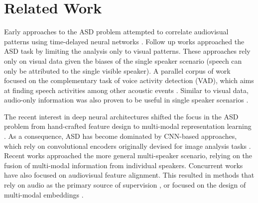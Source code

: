 \documentclass[10pt,twocolumn,letterpaper]{article}
\begin{document}
 \section{Related Work}

Early approaches to the ASD problem \cite{cutler2000look} attempted to correlate audiovisual patterns using time-delayed neural networks \cite{waibel1989phoneme}. Follow up works \cite{saenko2005visualspeech,everingham2009taking} approached the ASD task by limiting the analysis only to visual patterns. These approaches rely only on visual data given the biases of the single speaker scenario (\ie speech can only be attributed to the single visible speaker). A parallel corpus of work focused on the complementary task of voice activity detection (VAD), which aims at finding speech activities among other acoustic events \cite{tanyer2000voice,chang2006voice}. Similar to visual data, audio-only information was also proven to be useful in single speaker scenarios \cite{ding2019personal}.

The recent interest in deep neural architectures \cite{rumelhart1986learning,lecun1989handwritten,krizhevsky2012imagenet} shifted the focus in the ASD problem from hand-crafted feature design to multi-modal representation learning \cite{ngiam2011multimodal}. As a consequence, ASD has become dominated by CNN-based approaches, which rely on convolutional encoders originally devised for image analysis tasks \cite{roth2020ava}. Recent works \cite{chakravarty2016active,chung2016out} approached the more general multi-speaker scenario, relying on the fusion of multi-modal information from individual speakers. Concurrent works have also focused on audiovisual feature alignment. This resulted in methods that rely on audio as the primary source of supervision \cite{chakravarty2015s}, or focused on the design of multi-modal embeddings \cite{chung2018voxceleb2,chung2016out,nagrani2017voxceleb,tao2017bimodal}.
\end{document}
